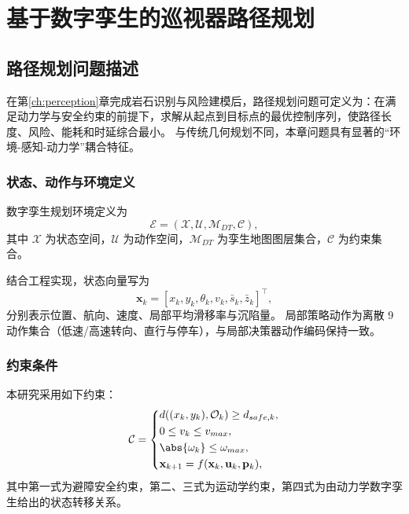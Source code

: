 \chapter{基于数字孪生的巡视器路径规划}
\label{ch:planning}

\section{路径规划问题描述}
\label{sec:ch6_problem}

在第\ref{ch:perception}章完成岩石识别与风险建模后，路径规划问题可定义为：在满足动力学与安全约束的前提下，求解从起点到目标点的最优控制序列，使路径长度、风险、能耗和时延综合最小。
与传统几何规划不同，本章问题具有显著的“环境-感知-动力学”耦合特征。

\subsection{状态、动作与环境定义}
\label{subsec:ch6_state_action}

数字孪生规划环境定义为
\begin{equation}
\mathcal{E}=\left(\mathcal{X},\mathcal{U},\mathcal{M}_{DT},\mathcal{C}\right),
\label{eq:ch6_env_def}
\end{equation}
其中 $\mathcal{X}$ 为状态空间，$\mathcal{U}$ 为动作空间，$\mathcal{M}_{DT}$ 为孪生地图图层集合，$\mathcal{C}$ 为约束集合。

结合工程实现，状态向量写为
\begin{equation}
\mathbf{x}_k=\left[x_k,y_k,\theta_k,v_k,\bar{s}_k,\bar{z}_k\right]^\top,
\label{eq:ch6_state}
\end{equation}
分别表示位置、航向、速度、局部平均滑移率与沉陷量。
局部策略动作为离散 9 动作集合（低速/高速转向、直行与停车），与局部决策器动作编码保持一致。

\subsection{约束条件}
\label{subsec:ch6_constraints}

本研究采用如下约束：
\begin{equation}
\mathcal{C}=
\left\{
\begin{aligned}
&d\!\left((x_k,y_k),\mathcal{O}_k\right)\ge d_{safe,k},\\
&0\le v_k\le v_{max},\\
&\abs{\omega_k}\le \omega_{max},\\
&\mathbf{x}_{k+1}=f(\mathbf{x}_k,\mathbf{u}_k,\mathbf{p}_k),
\end{aligned}
\right.
\label{eq:ch6_constraints}
\end{equation}
其中第一式为避障安全约束，第二、三式为运动学约束，第四式为由动力学数字孪生给出的状态转移关系。

